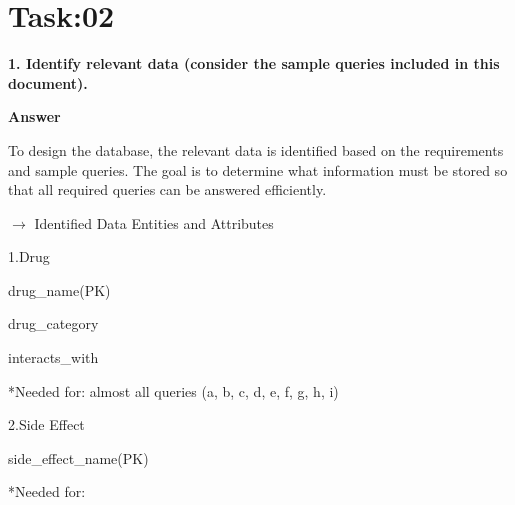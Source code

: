 \documentclass[12pt,a4paper]{article}
\begin{document}
\newpage
\section*{Task:02}
\textbf{1. Identify relevant data (consider the sample queries included in this document).}\par
\textbf{Answer}\par
To design the database, the relevant data is identified based on the requirements and sample queries. The goal is to determine what information must be stored so that all required queries can be answered efficiently.\par
$\rightarrow$ Identified Data Entities and Attributes\par
1.Drug\par
drug\_name(PK)\par
drug\_category\par
interacts\_with\par
*Needed for:
almost all queries (a, b, c, d, e, f, g, h, i)\par
2.Side Effect\par
side\_effect\_name(PK)\par

*Needed for:\par
\end{document}
